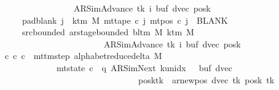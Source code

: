 \begin{isabellebody}
\ \ \ \ \ \ \ \ \ \ \ \ \ \ \ \ \ \ \ {\isacharparenleft}{\kern0pt}AR{\isacharunderscore}{\kern0pt}SimAdvance{\isacharcomma}{\kern0pt}\ tk{\isacharcomma}{\kern0pt}\ i{\isacharcomma}{\kern0pt}\ buf{\isacharcomma}{\kern0pt}\ dvec{\isacharcomma}{\kern0pt}\ posk{\isacharparenright}{\kern0pt}{\isachardoublequoteclose}\isanewline
\ \ \ \ \ \ \ pad{\isacharunderscore}{\kern0pt}blank{\isacharcolon}{\kern0pt}\ {\isachardoublequoteopen}{\isasymforall}j\ {\isasymge}\ k{\isacharunderscore}{\kern0pt}tm\ M{\isachardot}{\kern0pt}\ mt{\isacharunderscore}{\kern0pt}tape\ c{\isacharprime}{\kern0pt}\ j\ {\isacharparenleft}{\kern0pt}mt{\isacharunderscore}{\kern0pt}pos\ c{\isacharprime}{\kern0pt}\ j{\isacharparenright}{\kern0pt}\ {\isacharequal}{\kern0pt}\ BLANK{}{\isachardoublequoteclose}\isanewline
\ \ \ \ \ \ \ src{\isacharunderscore}{\kern0pt}bounded{\isacharcolon}{\kern0pt}\ {\isachardoublequoteopen}ar{\isacharunderscore}{\kern0pt}stage{\isacharunderscore}{\kern0pt}bounded\ {\isacharparenleft}{\kern0pt}bl{\isacharunderscore}{\kern0pt}tm\ M{\isacharparenright}{\kern0pt}\ {\isacharparenleft}{\kern0pt}k{\isacharunderscore}{\kern0pt}tm\ M{\isacharparenright}{\kern0pt}\isanewline
\ \ \ \ \ \ \ \ \ \ \ \ \ \ \ \ \ \ \ \ \ \ \ \ \ \ {\isacharparenleft}{\kern0pt}AR{\isacharunderscore}{\kern0pt}SimAdvance{\isacharcomma}{\kern0pt}\ tk{\isacharcomma}{\kern0pt}\ i{\isacharcomma}{\kern0pt}\ buf{\isacharcomma}{\kern0pt}\ dvec{\isacharcomma}{\kern0pt}\ posk{\isacharparenright}{\kern0pt}{\isachardoublequoteclose}\isanewline
\ \ \ {\isachardoublequoteopen}{\isasymexists}c{\isacharprime}{\kern0pt}{\isacharprime}{\kern0pt}{\isachardot}{\kern0pt}\ {\isacharparenleft}{\kern0pt}c{\isacharprime}{\kern0pt}{\isacharcomma}{\kern0pt}\ c{\isacharprime}{\kern0pt}{\isacharprime}{\kern0pt}{\isacharparenright}{\kern0pt}\ {\isasymin}\ mttm{\isacharunderscore}{\kern0pt}step\ {\isacharparenleft}{\kern0pt}alphabet{\isacharunderscore}{\kern0pt}reduce{\isacharunderscore}{\kern0pt}delta\ M{\isacharparenright}{\kern0pt}\isanewline
\ \ \ \ \ \ \ \ \ \ \ \ \ \ {\isasymand}\ mt{\isacharunderscore}{\kern0pt}state\ c{\isacharprime}{\kern0pt}{\isacharprime}{\kern0pt}\ {\isacharequal}{\kern0pt}\ {\isacharparenleft}{\kern0pt}q{\isacharcomma}{\kern0pt}\ AR{\isacharunderscore}{\kern0pt}SimNext{\isacharcomma}{\kern0pt}\ k{\isacharunderscore}{\kern0pt}unidx\ {}{\isacharcomma}{\kern0pt}\ {}{\isacharcomma}{\kern0pt}\ buf{\isacharcomma}{\kern0pt}\ dvec{\isacharcomma}{\kern0pt}\isanewline
\ \ \ \ \ \ \ \ \ \ \ \ \ \ \ \ \ \ \ \ \ \ \ \ \ \ \ \ \ \ \ \ \ \ posk{\isacharparenleft}{\kern0pt}tk\ {\isacharcolon}{\kern0pt}{\isacharequal}{\kern0pt}\ ar{\isacharunderscore}{\kern0pt}newpos\ {\isacharparenleft}{\kern0pt}dvec\ tk{\isacharparenright}{\kern0pt}\ {\isacharparenleft}{\kern0pt}posk\ tk{\isacharparenright}{\kern0pt}{\isacharparenright}{\kern0pt}{\isacharparenright}{\kern0pt}\isanewline

\end{isabellebody}
